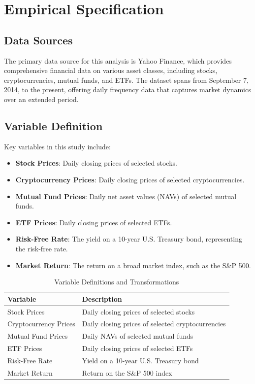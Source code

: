 \section{Empirical Specification}
\subsection{Data Sources}
The primary data source for this analysis is Yahoo Finance, which provides comprehensive financial data on various asset classes, including stocks, cryptocurrencies, mutual funds, and ETFs. The dataset spans from September 7, 2014, to the present, offering daily frequency data that captures market dynamics over an extended period.

\subsection{Variable Definition}
Key variables in this study include:
\begin{itemize}
    \item \textbf{Stock Prices}: Daily closing prices of selected stocks.
    \item \textbf{Cryptocurrency Prices}: Daily closing prices of selected cryptocurrencies.
    \item \textbf{Mutual Fund Prices}: Daily net asset values (NAVs) of selected mutual funds.
    \item \textbf{ETF Prices}: Daily closing prices of selected ETFs.
    \item \textbf{Risk-Free Rate}: The yield on a 10-year U.S. Treasury bond, representing the risk-free rate.
    \item \textbf{Market Return}: The return on a broad market index, such as the S\&P 500.
\end{itemize}

\begin{table}[h]
\centering
\begin{tabular}{|l|l|}
\hline
\textbf{Variable} & \textbf{Description} \\ \hline
Stock Prices & Daily closing prices of selected stocks \\ \hline
Cryptocurrency Prices & Daily closing prices of selected cryptocurrencies \\ \hline
Mutual Fund Prices & Daily NAVs of selected mutual funds \\ \hline
ETF Prices & Daily closing prices of selected ETFs \\ \hline
Risk-Free Rate & Yield on a 10-year U.S. Treasury bond \\ \hline
Market Return & Return on the S\&P 500 index \\ \hline
\end{tabular}
\caption{Variable Definitions and Transformations}
\label{tab:variables}
\end{table}

